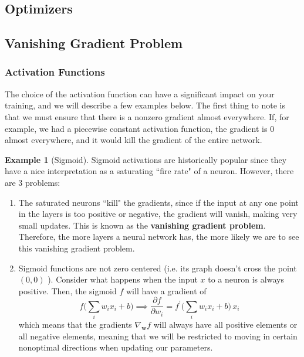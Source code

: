 \documentclass{article}
\theoremstyle{definition}
\newtheorem{example}{Example}[section]
\theoremstyle{remark}
\theoremstyle{definition}
\begin{document}
  \subsection{Optimizers}


  \subsection{Vanishing Gradient Problem}

    \subsubsection{Activation Functions}

      The choice of the activation function can have a significant impact on your training, and we will describe a few examples below. The first thing to note is that we must ensure that there is a nonzero gradient almost everywhere. If, for example, we had a piecewise constant activation function, the gradient is $0$ almost everywhere, and it would kill the gradient of the entire network. 

      \begin{example}[Sigmoid]
      Sigmoid activations are historically popular since they have a nice interpretation as a saturating ``fire rate" of a neuron. However, there are 3 problems: 
      \begin{enumerate}
          \item The saturated neurons ``kill" the gradients, since if the input at any one point in the layers is too positive or negative, the gradient will vanish, making very small updates. This is known as the \textbf{vanishing gradient problem}. Therefore, the more layers a neural network has, the more likely we are to see this vanishing gradient problem. 
          \item Sigmoid functions are not zero centered (i.e. its graph doesn't cross the point $(0, 0)$ ). Consider what happens when the input $x$ to a neuron is always positive. Then, the sigmoid $f$ will have a gradient of 
          \[f \bigg( \sum_i w_i x_i + b \bigg) \implies \frac{\partial f}{\partial w_i} = f^\prime \bigg( \sum_i w_i x_i + b \bigg) 
          \, x_i\]
          which means that the gradients $\nabla_\mathbf{w} f$ will always have all positive elements or all negative elements, meaning that we will be restricted to moving in certain nonoptimal directions when updating our parameters. 
      \end{enumerate}
      \end{example}
\end{document}
